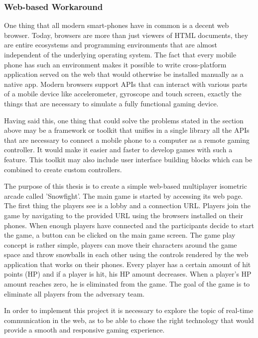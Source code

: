 \subsubsection{Web-based Workaround}

One thing that all modern smart-phones have in common is a decent web browser.
Today, browsers are more than just viewers of HTML documents, they are entire
ecosystems and programming environments that are almost independent of the
underlying operating system. The fact that every mobile phone has such an
environment makes it possible to write cross-platform application served on
the web that would otherwise be installed manually as a native app. Modern
browsers support APIs that can interact with various parts of a mobile device
like accelerometer, gyroscope and touch screen, exactly the things that are
necessary to simulate a fully functional gaming device.

Having said this, one thing that could solve the problems stated in the
section above may be a framework or toolkit that unifies in a single library
all the APIs that are necessary to connect a mobile phone to a computer as a
remote gaming controller. It would make it easier and faster to develop games
with such a feature. This toolkit may also include user interface building
blocks which can be combined to create custom controllers.

The purpose of this thesis is to create a simple web-based multiplayer
isometric arcade called 'Snowfight'. The main game is started by accessing its
web page. The first thing the players see is a lobby and a connection URL.
Players join the game by navigating to the provided URL using the browsers
installed on their phones. When enough players have connected and the
participants decide to start the game, a button can be clicked on the main
game screen. The game play concept is rather simple, players can move their
characters around the game space and throw snowballs in each other using the
controls rendered by the web application that works on their phones. Every
player has a certain amount of hit points (HP) and if a player is hit, his HP
amount decreases. When a player's HP amount reaches zero, he is eliminated
from the game. The goal of the game is to eliminate all players from the
adversary team.

In order to implement this project it is necessary to explore the topic of
real-time communication in the web, as to be able to chose the right technology
that would provide a smooth and responsive gaming experience.



